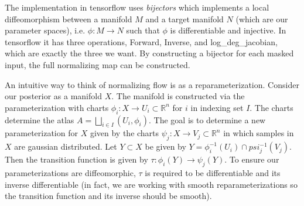 The implementation in tensorflow uses \textit{bijectors} which implements a local diffeomorphism between a manifold $M$ and a target manifold $N$ (which are our parameter spaces), i.e. $\phi:M\rightarrow N$ such that $\phi$ is differentiable and injective. 
In tensorflow it has three operations, Forward, Inverse, and log\_deg\_jacobian, which are exactly the three we want. 
By constructing a bijector for each masked input, the full normalizing map can be constructed.

An intuitive way to think of normalizing flow is as a reparameterization. Consider our posterior as a manifold $X$. The manifold is constructed via the parameterization with charts $\phi_i:X\rightarrow U_i \subset \mathbb{R}^n$ for $i$ in indexing set $I$. 
The charts determine the atlas $A = \bigsqcup\limits_{i\in I} (U_i,\phi_i)$. 
The goal is to determine a new parameterization for $X$ given by the charts $\psi_j:X\rightarrow V_j \subset \mathbb{R}^n$ in which samples in $X$ are gaussian distributed. 
Let $Y \subset X$ be given by $Y = \phi_i^{-1}(U_i) \cap psi_j^{-1}(V_j)$. 
Then the transition function is given by $\tau:\phi_i(Y)\rightarrow\psi_j(Y)$. 
To ensure our parameterizations are diffeomorphic, $\tau$ is required to be differentiable and its inverse differentiable 
(in fact, we are working with smooth reparameterizations so the transition function and its inverse should be smooth).

